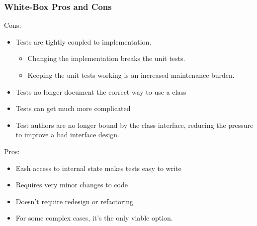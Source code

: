 \begin{frame}[fragile,t]
\frametitle{White-Box Pros and Cons}

Cons:
\begin{itemize}
\item Tests are tightly coupled to implementation.
\begin{itemize}
  \item Changing the implementation breaks the unit tests.
  \item Keeping the unit tests working is an increased maintenance burden.
\end{itemize}
\item Tests no longer document the correct way to use a class
\item Tests can get much more complicated
\item Test authors are no longer bound by the class interface,
  reducing the pressure to improve a bad interface design.
\end{itemize}

Pros:
\begin{itemize}
\item Eash access to internal state makes tests easy to write
\item Requires very minor changes to code
\item Doesn't require redesign or refactoring
\item For some complex cases, it's the only viable option.
\end{itemize}


\end{frame}



